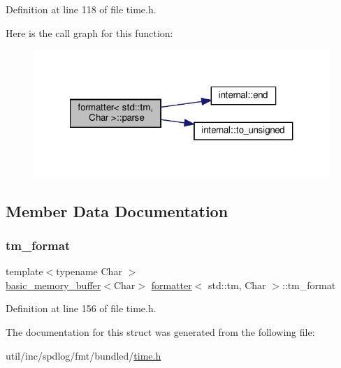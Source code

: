 Definition at line 118 of file time.\+h.

Here is the call graph for this function\+:
\nopagebreak
\begin{figure}[H]
\begin{center}
\leavevmode
\includegraphics[width=321pt]{structformatter_3_01std_1_1tm_00_01_char_01_4_a48e18c3d8fc0bf234d6981a60828f5ca_cgraph}
\end{center}
\end{figure}


\subsection{Member Data Documentation}
\mbox{\label{structformatter_3_01std_1_1tm_00_01_char_01_4_a2a9d9612580cc86f7670f68eb150ca95}} 
\subsubsection{\texorpdfstring{tm\+\_\+format}{tm\_format}}
{\footnotesize\ttfamily template$<$typename Char $>$ \\
\hyperlink{classbasic__memory__buffer}{basic\+\_\+memory\+\_\+buffer}$<$Char$>$ \hyperlink{structformatter}{formatter}$<$ std\+::tm, Char $>$\+::tm\+\_\+format}



Definition at line 156 of file time.\+h.



The documentation for this struct was generated from the following file\+:\begin{DoxyCompactItemize}
\item 
util/inc/spdlog/fmt/bundled/\hyperlink{time_8h}{time.\+h}\end{DoxyCompactItemize}
